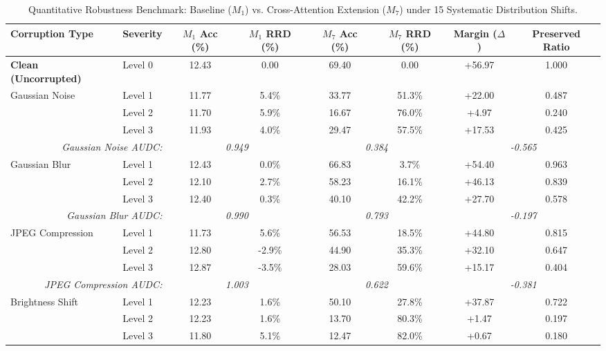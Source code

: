 \begin{table}[t]
\centering
\caption{Quantitative Robustness Benchmark: Baseline ($M_1$) vs. Cross-Attention Extension ($M_7$) under 15 Systematic Distribution Shifts.}
\label{tab:robustness_benchmark}
\small
\begin{tabular}{ll ccccc c}
\toprule
\textbf{Corruption Type} & \textbf{Severity} & \textbf{$M_1$ Acc (\%)} & \textbf{$M_1$ RRD (\%)} & \textbf{$M_7$ Acc (\%)} & \textbf{$M_7$ RRD (\%)} & \textbf{Margin ($\Delta$)} & \textbf{Preserved Ratio} \\
\midrule
\textbf{Clean (Uncorrupted)} & Level 0 & 12.43 & 0.00 & 69.40 & 0.00 & +56.97 & 1.000 \\
\midrule
Gaussian Noise & Level 1 & 11.77 & 5.4\% & 33.77 & 51.3\% & +22.00 & 0.487 \\
 & Level 2 & 11.70 & 5.9\% & 16.67 & 76.0\% & +4.97 & 0.240 \\
 & Level 3 & 11.93 & 4.0\% & 29.47 & 57.5\% & +17.53 & 0.425 \\
\multicolumn{2}{r}{\textit{Gaussian Noise AUDC:}} & \multicolumn{2}{c}{\textit{0.949}} & \multicolumn{2}{c}{\textit{0.384}} & \multicolumn{2}{c}{\textit{-0.565}} \\
\midrule
Gaussian Blur & Level 1 & 12.43 & 0.0\% & 66.83 & 3.7\% & +54.40 & 0.963 \\
 & Level 2 & 12.10 & 2.7\% & 58.23 & 16.1\% & +46.13 & 0.839 \\
 & Level 3 & 12.40 & 0.3\% & 40.10 & 42.2\% & +27.70 & 0.578 \\
\multicolumn{2}{r}{\textit{Gaussian Blur AUDC:}} & \multicolumn{2}{c}{\textit{0.990}} & \multicolumn{2}{c}{\textit{0.793}} & \multicolumn{2}{c}{\textit{-0.197}} \\
\midrule
JPEG Compression & Level 1 & 11.73 & 5.6\% & 56.53 & 18.5\% & +44.80 & 0.815 \\
 & Level 2 & 12.80 & -2.9\% & 44.90 & 35.3\% & +32.10 & 0.647 \\
 & Level 3 & 12.87 & -3.5\% & 28.03 & 59.6\% & +15.17 & 0.404 \\
\multicolumn{2}{r}{\textit{JPEG Compression AUDC:}} & \multicolumn{2}{c}{\textit{1.003}} & \multicolumn{2}{c}{\textit{0.622}} & \multicolumn{2}{c}{\textit{-0.381}} \\
\midrule
Brightness Shift & Level 1 & 12.23 & 1.6\% & 50.10 & 27.8\% & +37.87 & 0.722 \\
 & Level 2 & 12.23 & 1.6\% & 13.70 & 80.3\% & +1.47 & 0.197 \\
 & Level 3 & 11.80 & 5.1\% & 12.47 & 82.0\% & +0.67 & 0.180 \\

\end{tabular}
\end{table}
